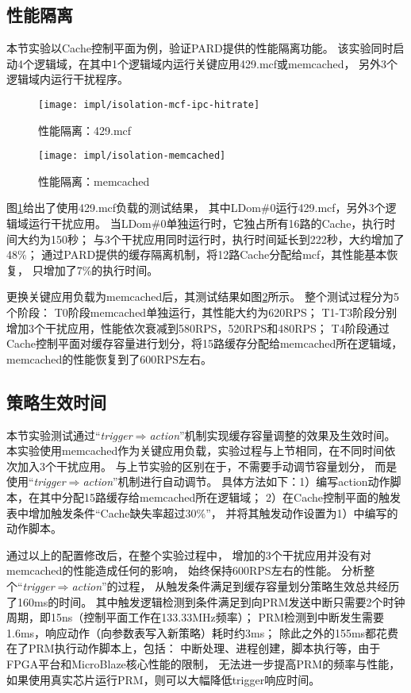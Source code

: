 \subsection{性能隔离}

本节实验以Cache控制平面为例，验证PARD提供的性能隔离功能。
该实验同时启动4个逻辑域，在其中1个逻辑域内运行关键应用429.mcf或memcached，
另外3个逻辑域内运行干扰程序。

\begin{figure}[tb]
  \centering
  \texttt{[image: impl/isolation-mcf-ipc-hitrate]}
  \caption{性能隔离：429.mcf}
  \label{fig:isolation-mcf-ipc-hitrate}
\end{figure}

\begin{figure}[tb]
  \centering
  \texttt{[image: impl/isolation-memcached]}
  \caption{性能隔离：memcached}
  \label{fig:isolation-memcached}
\end{figure}

图\ref{fig:isolation-mcf-ipc-hitrate}给出了使用429.mcf负载的测试结果，
其中LDom\#0运行429.mcf，另外3个逻辑域运行干扰应用。
当LDom\#0单独运行时，它独占所有16路的Cache，执行时间大约为150秒；
与3个干扰应用同时运行时，执行时间延长到222秒，大约增加了48\%；
通过PARD提供的缓存隔离机制，将12路Cache分配给mcf，其性能基本恢复，
只增加了7\%的执行时间。

更换关键应用负载为memcached后，其测试结果如图\ref{fig:isolation-memcached}所示。
整个测试过程分为5个阶段：
T0阶段memcached单独运行，其性能大约为620RPS；
T1-T3阶段分别增加3个干扰应用，性能依次衰减到580RPS，520RPS和480RPS；
T4阶段通过Cache控制平面对缓存容量进行划分，将15路缓存分配给memcached所在逻辑域，
memcached的性能恢复到了600RPS左右。


\subsection{策略生效时间}
\label{chap:impl:trigger-latency}

本节实验测试通过``\emph{trigger$\Rightarrow$action}''机制实现缓存容量调整的效果及生效时间。
本实验使用memcached作为关键应用负载，实验过程与上节相同，在不同时间依次加入3个干扰应用。
与上节实验的区别在于，不需要手动调节容量划分，
而是使用``\emph{trigger$\Rightarrow$action}''机制进行自动调节。
具体方法如下：1）编写action动作脚本，在其中分配15路缓存给memcached所在逻辑域；
2）在Cache控制平面的触发表中增加触发条件``Cache缺失率超过30\%''，
并将其触发动作设置为1）中编写的动作脚本。

通过以上的配置修改后，在整个实验过程中，
增加的3个干扰应用并没有对memcached的性能造成任何的影响，
始终保持600RPS左右的性能。
分析整个``\emph{trigger$\Rightarrow$action}''的过程，
从触发条件满足到缓存容量划分策略生效总共经历了160ms的时间。
其中触发逻辑检测到条件满足到向PRM发送中断只需要2个时钟周期，即15ns（控制平面工作在133.33MHz频率）；
PRM检测到中断发生需要1.6ms，响应动作（向参数表写入新策略）耗时约3ms；
除此之外的155ms都花费在了PRM执行动作脚本上，包括：
中断处理、进程创建，脚本执行等，由于FPGA平台和MicroBlaze核心性能的限制，
无法进一步提高PRM的频率与性能，如果使用真实芯片运行PRM，则可以大幅降低trigger响应时间。

